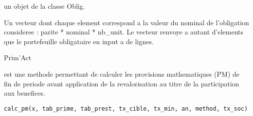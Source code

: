 \documentclass[a4paper]{book}
\begin{document}
%
\begin{Arguments}
\begin{ldescription}
\item[\code{x}] un objet de la classe Oblig.
\end{ldescription}
\end{Arguments}
%
\begin{Value}
Un vecteur dont chaque element correspond a la valeur du nominal de l'obligation consideree : parite * nominal * nb\_unit.
Le vecteur renvoye a autant d'elements que le portefeuille obligataire en input a de lignes.
\end{Value}
%
\begin{Author}\relax
Prim'Act
\end{Author}
%
\begin{Description}\relax
{} est une methode permettant de calculer les provisions mathematiques (PM)
de fin de periode avant application de la revalorisation au titre de la participation aux benefices.
\end{Description}
%
\begin{Usage}
\begin{verbatim}
calc_pm(x, tab_prime, tab_prest, tx_cible, tx_min, an, method, tx_soc)
\end{verbatim}
\end{Usage}
%
\end{document}
